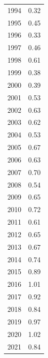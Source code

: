 \documentclass{mcmthesis}
\begin{document}
\begin{appendices}
\begin{longtable}{rr}
1994 & 0.32 \\
1995 & 0.45 \\
1996 & 0.33 \\
1997 & 0.46 \\
1998 & 0.61 \\
1999 & 0.38 \\
2000 & 0.39 \\
2001 & 0.53 \\
2002 & 0.63 \\
2003 & 0.62 \\
2004 & 0.53 \\
2005 & 0.67 \\
2006 & 0.63 \\
2007 & 0.70 \\
2008 & 0.54 \\
2009 & 0.65 \\
2010 & 0.72 \\
2011 & 0.61 \\
2012 & 0.65 \\
2013 & 0.67 \\
2014 & 0.74 \\
2015 & 0.89 \\
2016 & 1.01 \\
2017 & 0.92 \\
2018 & 0.84 \\
2019 & 0.97 \\
2020 & 1.02 \\
2021 & 0.84 \\
\bottomrule
\end{longtable}


\end{appendices}
\end{document}
